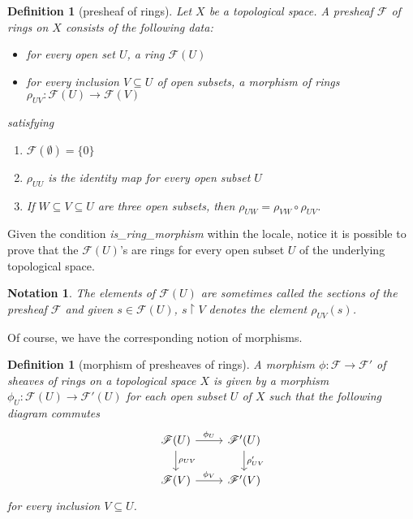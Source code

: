 \documentclass[12pt]{scrartcl}
\newtheorem{definition}[proposition]{Definition}
\newtheorem{notation}{Notation}
\begin{document}
\begin{definition}[presheaf of rings]
	Let $X$ be a topological space. A presheaf $\mathscr{F}$ of rings on $X$ consists of the following data:
	\begin{itemize}
		\item for every open set $U$, a ring $\mathscr{F}(U)$
		\item for every inclusion $V \subseteq U$ of open subsets, a morphism of rings $\rho_{UV}: \mathscr{F}(U) \rightarrow \mathscr{F}(V)$  
	\end{itemize}
satisfying 
	\begin{enumerate}
		\item $\mathscr{F}(\emptyset) = \lbrace 0 \rbrace$
		\item $\rho_{UU}$ is the identity map for every open subset $U$
		\item  If $W \subseteq V \subseteq U$ are three open subsets, then $\rho_{UW} = \rho_{VW} \circ \rho_{UV}$.
	\end{enumerate}
\end{definition}


Given the condition \textit{is\_ring\_morphism} within the locale, notice it is possible to prove that the $\mathscr{F}(U)$'s are rings for every open subset $U$ of the underlying topological space.


\begin{notation}
	The elements of $\mathscr{F}(U)$ are sometimes called the sections of the presheaf $\mathscr{F}$ and given $s \in \mathscr{F}(U)$, $s\restriction V$ denotes the element $\rho_{UV}(s)$.
\end{notation}

Of course, we have the corresponding notion of morphisms.

\begin{definition}[morphism of presheaves of rings]
	A morphism $\phi: \mathscr{F} \rightarrow \mathscr{F}'$ of sheaves of rings on a topological space $X$ is given by a morphism $\phi_U: \mathscr{F}(U) \rightarrow \mathscr{F}'(U)$ for each open subset $U$ of $X$ such that  the following diagram commutes
	\[
	\begin{tikzcd}
	\mathscr{F}(U) \arrow[r, "\phi_U"] \arrow[d, "\rho_{UV}"] & \mathscr{F}'(U) \arrow[d, "\rho'_{UV}"] \\
	\mathscr{F}(V) \arrow[r, "\phi_V"] & \mathscr{F}'(V) 
	\end{tikzcd}
	\]
	for every inclusion $V \subseteq U$.
\end{definition}
\end{document}
